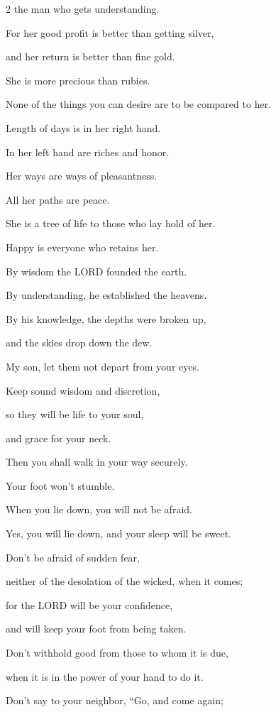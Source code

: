 \begin{multicols}{2}
the man who gets understanding.


\myverse{}For her good profit is better than getting silver,

and her return is better than fine gold.


\myverse{}She is more precious than rubies.

None of the things you can desire are to be compared to her.


\myverse{}Length of days is in her right hand.

In her left hand are riches and honor.


\myverse{}Her ways are ways of pleasantness.

All her paths are peace.


\myverse{}She is a tree of life to those who lay hold of her.

Happy is everyone who retains her.


\myverse{}By wisdom the LORD founded the earth.

By understanding, he established the heavens.


\myverse{}By his knowledge, the depths were broken up,

and the skies drop down the dew.


\myverse{}My son, let them not depart from your eyes.

Keep sound wisdom and discretion,


\myverse{}so they will be life to your soul,

and grace for your neck.


\myverse{}Then you shall walk in your way securely.

Your foot won’t stumble.


\myverse{}When you lie down, you will not be afraid.

Yes, you will lie down, and your sleep will be sweet.


\myverse{}Don’t be afraid of sudden fear,

neither of the desolation of the wicked, when it comes;


\myverse{}for the LORD will be your confidence,

and will keep your foot from being taken.


\vspace{\baselineskip} 
\myverse{}Don’t withhold good from those to whom it is due,

when it is in the power of your hand to do it.


\myverse{}Don’t say to your neighbor, “Go, and come again;


\end{multicols}
